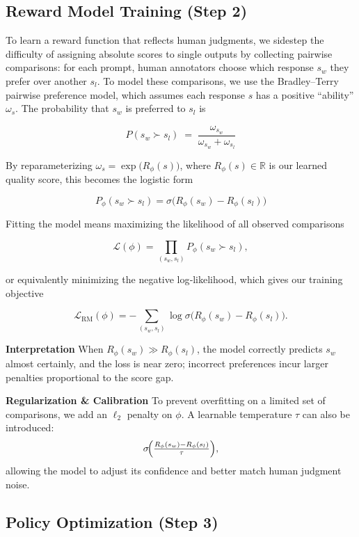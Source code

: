 \documentclass{article}
\begin{document}
\subsection{Reward Model Training (Step 2)}

To learn a reward function that reflects human judgments, we sidestep the difficulty of assigning absolute scores to single outputs by collecting pairwise comparisons: for each prompt, human annotators choose which response \(s_w\) they prefer over another \(s_l\).  To model these comparisons, we use the Bradley–Terry pairwise preference model, which assumes each response \(s\) has a positive “ability” \(\omega_s\).  The probability that \(s_w\) is preferred to \(s_l\) is

\[
  P(s_w \succ s_l)
  \;=\;
  \frac{\omega_{s_w}}{\omega_{s_w} + \omega_{s_l}}
\]

By reparameterizing \(\omega_s = \exp\bigl(R_\phi(s)\bigr)\), where \(R_\phi(s)\in\mathbb{R}\) is our learned quality score, this becomes the logistic form

\[
  P_\phi(s_w \succ s_l)
  = \sigma\!\bigl(R_\phi(s_w) - R_\phi(s_l)\bigr)
\]

Fitting the model means maximizing the likelihood of all observed comparisons

\[
  \mathcal{L}(\phi)
  = \prod_{(s_w,s_l)} P_\phi(s_w \succ s_l),
\]

or equivalently minimizing the negative log‐likelihood, which gives our training objective

\[
  \mathcal{L}_{\mathrm{RM}}(\phi)
  = -\sum_{(s_w,s_l)} \log \sigma\!\bigl(R_\phi(s_w)-R_\phi(s_l)\bigr).
\]

\noindent\textbf{Interpretation}  When \(R_\phi(s_w)\gg R_\phi(s_l)\), the model correctly predicts \(s_w\) almost certainly, and the loss is near zero; incorrect preferences incur larger penalties proportional to the score gap.

\noindent\textbf{Regularization \& Calibration}  To prevent overfitting on a limited set of comparisons, we add an \(\ell_2\) penalty on \(\phi\).  A learnable temperature \(\tau\) can also be introduced:
\[
  \sigma\!\Bigl(\tfrac{R_\phi(s_w)-R_\phi(s_l)}{\tau}\Bigr),
\]
allowing the model to adjust its confidence and better match human judgment noise.

\subsection{Policy Optimization (Step 3)}
\end{document}
